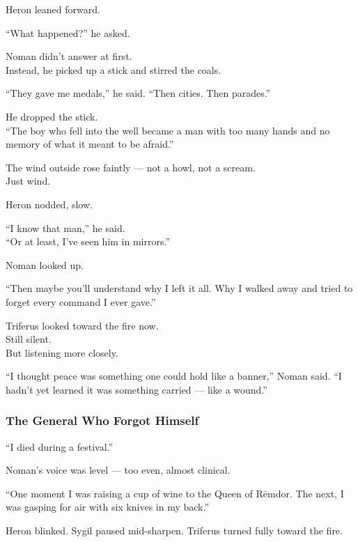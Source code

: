 \documentclass[12pt]{article}
\begin{document}
Heron leaned forward.

“What happened?” he asked.

Noman didn’t answer at first.\\
Instead, he picked up a stick and stirred the coals.

“They gave me medals,” he said. “Then cities. Then parades.”

He dropped the stick.\\
“The boy who fell into the well became a man with too many hands and no memory of what it meant to be afraid.”

The wind outside rose faintly — not a howl, not a scream.\\
Just wind.

\vspace{1em}

Heron nodded, slow.

“I know that man,” he said.\\
“Or at least, I’ve seen him in mirrors.”

\vspace{1em}

Noman looked up.

“Then maybe you’ll understand why I left it all. Why I walked away and tried to forget every command I ever gave.”

Triferus looked toward the fire now.\\
Still silent.\\
But listening more closely.

\vspace{1em}

“I thought peace was something one could hold like a banner,” Noman said. “I hadn’t yet learned it was something carried — like a wound.”

\dotfill

\subsubsection*{The General Who Forgot Himself}

“I died during a festival.”

Noman’s voice was level — too even, almost clinical.

“One moment I was raising a cup of wine to the Queen of Rēmdor. The next, I was gasping for air with six knives in my back.”

\vspace{1em}

Heron blinked. Sygil paused mid-sharpen. Triferus turned fully toward the fire.
\end{document}
